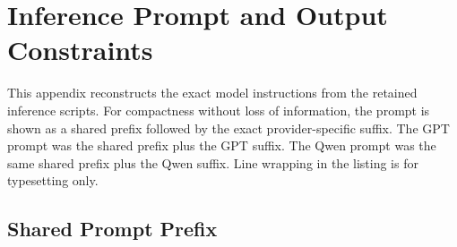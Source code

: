 \chapter{Inference Prompt and Output Constraints}
\label{app:prompt}

This appendix reconstructs the exact model instructions from the retained
inference scripts. For compactness without loss of information, the prompt is
shown as a shared prefix followed by the exact provider-specific suffix. The
GPT prompt was the shared prefix plus the GPT suffix. The Qwen prompt was the
same shared prefix plus the Qwen suffix. Line wrapping in the listing is for
typesetting only.

\lstset{
  basicstyle=\ttfamily\scriptsize,
  breaklines=true,
  breakatwhitespace=true,
  columns=fullflexible,
  frame=single,
  showstringspaces=false
}

\section{Shared Prompt Prefix}

